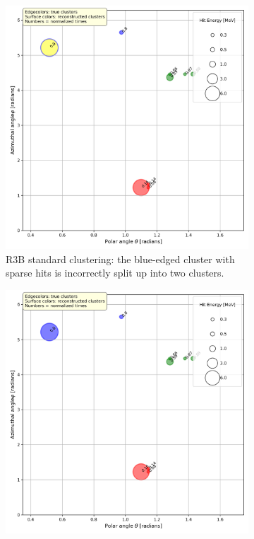 \documentclass[final,5p,times,twocolumn]{elsarticle}
\begin{document}
\begin{figure}[htbp]
    \centering
    \begin{subfigure}[b]{0.45\textwidth}
        \includegraphics[width=\textwidth]{best_example_bad_r3b.png}
	\centering
        \caption{R3B standard clustering: the blue-edged cluster with sparse hits is incorrectly split up into two clusters.}
        \label{fig:subfig1}
    \end{subfigure}
    \hfill
    \begin{subfigure}[b]{0.45\textwidth}
        \includegraphics[width=\textwidth]{best_example_good_agglo_edge.png}

\end{subfigure}
\end{figure}
\end{document}
